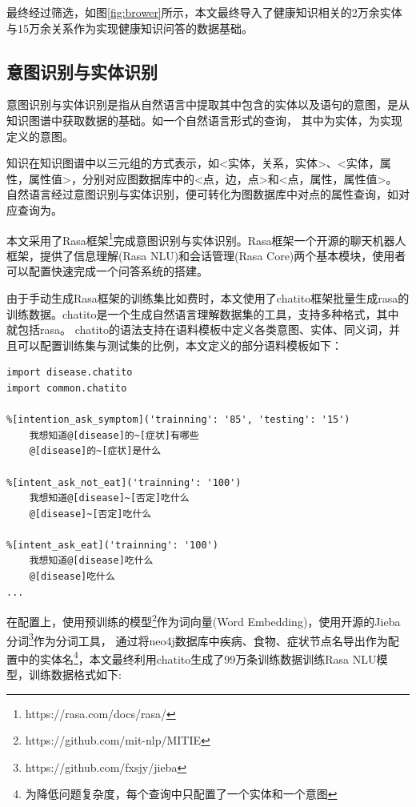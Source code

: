 最终经过筛选，如图\ref{fig:brower}所示，本文最终导入了健康知识相关的2万余实体与15万余关系作为实现健康知识问答的数据基础。

\subsection{意图识别与实体识别}

意图识别与实体识别是指从自然语言中提取其中包含的实体以及语句的意图，是从知识图谱中获取数据的基础。如一个自然语言形式的查询，
其中为实体，为实现定义的意图。

知识在知识图谱中以三元组的方式表示，如<实体，关系，实体>、<实体，属性，属性值>，分别对应图数据库中的<点，边，点>和<点，属性，属性值>。
自然语言经过意图识别与实体识别，便可转化为图数据库中对点的属性查询，如对应查询为。

本文采用了Rasa框架\footnote{https://rasa.com/docs/rasa/}完成意图识别与实体识别。Rasa框架一个开源的聊天机器人框架，提供了信息理解(Rasa NLU)和会话管理(Rasa Core)两个基本模块，使用者可以配置快速完成一个问答系统的搭建。

由于手动生成Rasa框架的训练集比如费时，本文使用了chatito框架批量生成rasa的训练数据。chatito是一个生成自然语言理解数据集的工具，支持多种格式，其中就包括rasa。
chatito的语法支持在语料模板中定义各类意图、实体、同义词，并且可以配置训练集与测试集的比例，本文定义的部分语料模板如下：
\begin{lstlisting}[label=lst:chatito, caption={chatito部分语料模板配置}, basicstyle=\normalsize]
import disease.chatito
import common.chatito

%[intention_ask_symptom]('trainning': '85', 'testing': '15')
    我想知道@[disease]的~[症状]有哪些
    @[disease]的~[症状]是什么

%[intent_ask_not_eat]('trainning': '100')
    我想知道@[disease]~[否定]吃什么
    @[disease]~[否定]吃什么

%[intent_ask_eat]('trainning': '100')
    我想知道@[disease]吃什么
    @[disease]吃什么
...
\end{lstlisting}

在配置上，使用预训练的模型\footnote{https://github.com/mit-nlp/MITIE}作为词向量(Word Embedding)，使用开源的Jieba分词\footnote{https://github.com/fxsjy/jieba}作为分词工具，
通过将neo4j数据库中疾病、食物、症状节点名导出作为配置中的实体名\footnote{为降低问题复杂度，每个查询中只配置了一个实体和一个意图}，本文最终利用chatito生成了99万条训练数据训练Rasa NLU模型，训练数据格式如下:

